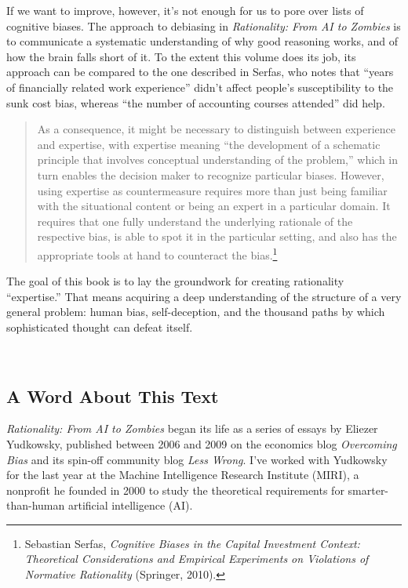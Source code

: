 \documentclass[letterpaper]{book}
\newcommand{\comment}[1]{
}
\begin{document}
{
 If we want to improve, however, it's not enough
for us to pore over lists of cognitive biases. The approach to
debiasing in \textit{Rationality: From AI to Zombies} is to communicate
a systematic understanding of why good reasoning works, and of how the
brain falls short of it. To the extent this volume does its job, its
approach can be compared to the one described in Serfas, who notes that
``years of financially related work
experience'' didn't affect
people's susceptibility to the sunk cost bias, whereas
``the number of accounting courses
attended'' did help.}

\begin{quote}
 As a consequence, it might be necessary to distinguish between
experience and expertise, with expertise meaning ``the
development of a schematic principle that involves conceptual
understanding of the problem,'' which in turn enables
the decision maker to recognize particular biases. However, using
expertise as countermeasure requires more than just being familiar with
the situational content or being an expert in a particular domain. It
requires that one fully understand the underlying rationale of the
respective bias, is able to spot it in the particular setting, and also
has the appropriate tools at hand to counteract the
bias.\footnote{Sebastian Serfas, \textit{Cognitive Biases in the Capital
Investment Context: Theoretical Considerations and Empirical
Experiments on Violations of Normative Rationality} (Springer, 2010).\comment{19}}
\end{quote}

{
 The goal of this book is to lay the groundwork for creating
rationality ``expertise.'' That
means acquiring a deep understanding of the structure of a very general
problem: human bias, self-deception, and the thousand paths by which
sophisticated thought can defeat itself.}

{
 ~}

\subsection{A Word About This Text}

{
 \textit{Rationality: From AI to Zombies} began its life as a
series of essays by Eliezer Yudkowsky, published between 2006 and 2009
on the economics blog \textit{Overcoming Bias} and its spin-off
community blog \textit{Less Wrong}. I've worked with
Yudkowsky for the last year at the Machine Intelligence Research
Institute (MIRI), a nonprofit he founded in 2000 to study the
theoretical requirements for smarter-than-human artificial intelligence
(AI).}
\end{document}
